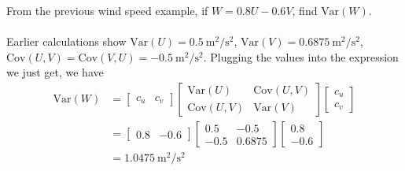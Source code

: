\begin{exmp}
From the previous wind speed example, if $W = 0.8U-0.6V$, find $\text{Var}(W)$.\\
\\
Earlier calculations show $\text{Var}(U) = \SI{0.5}{\square\m \per \square\s}$,
$\text{Var}(V) = \SI{0.6875}{\square\m \per \square\s}$, $\text{Cov}(U,V) = \text{Cov}(V,U) = \SI{-0.5}{\square\m \per \square\s}$. Plugging the values into the expression we just get, we have
\begin{align*}
\text{Var}(W) &=
\begin{bmatrix}
c_u & c_v
\end{bmatrix}
\begin{bmatrix}
\text{Var}(U) & \text{Cov}(U,V) \\
\text{Cov}(U,V) & \text{Var}(V)
\end{bmatrix}
\begin{bmatrix}
c_u \\
c_v
\end{bmatrix} \\
&=
\begin{bmatrix}
0.8 & -0.6
\end{bmatrix}
\begin{bmatrix}
0.5 & -0.5 \\
-0.5 & 0.6875
\end{bmatrix}
\begin{bmatrix}
0.8 \\
-0.6
\end{bmatrix} \\
&= \SI{1.0475}{\square\m \per \square\s}
\end{align*}
\end{exmp}


